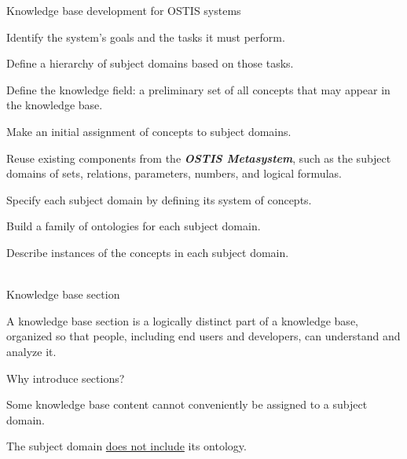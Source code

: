 \begin{frame}{Knowledge base development for OSTIS systems}
	\topline
	\justifying
	\vspace{8mm}
	\begin{textitemize}
		\item Identify the system's goals and the tasks it must perform.
		\item Define a hierarchy of subject domains based on those tasks.
		\begin{textitemize}
			\item Define the knowledge field: a preliminary set of all concepts that may appear in the knowledge base.
			\item Make an initial assignment of concepts to subject domains.
			\item Reuse existing components from the \textbf{\textit{OSTIS Metasystem}}, such as the subject domains of sets, relations, parameters, numbers, and logical formulas.
		\end{textitemize}
		\item Specify each subject domain by defining its system of concepts.
		\item Build a family of ontologies for each subject domain.
		\item Describe instances of the concepts in each subject domain.
	\end{textitemize}
\end{frame}

\begin{frame}{\\Knowledge base section}
	\topline
	\justifying
	\vspace{8mm}

	A knowledge base section is a logically distinct part of a knowledge base, organized so that people, including end users and developers, can understand and analyze it.
	\bigskip

	Why introduce sections?
	\begin{textitemize}
		\item Some knowledge base content cannot conveniently be assigned to a subject domain.
		\item The subject domain \underline{does not include} its ontology.
	\end{textitemize}
\end{frame}

